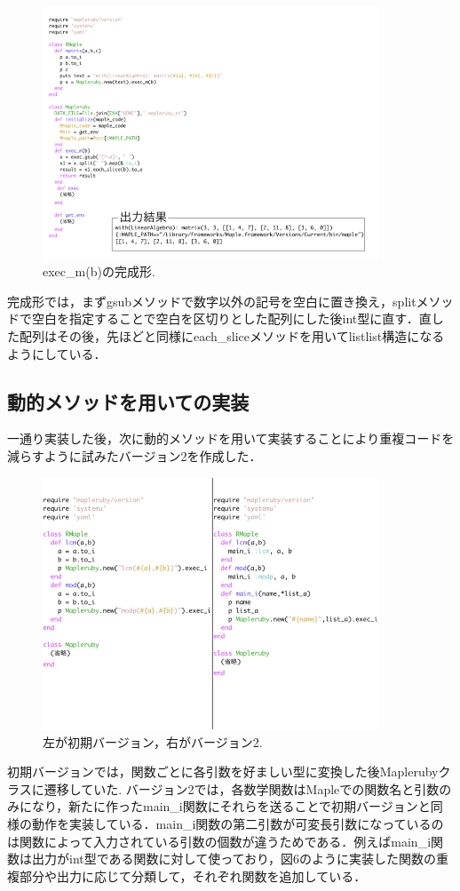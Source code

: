 \begin{figure}[htbp]\begin{center}
\includegraphics[width=10cm,bb= 0 0 737 553]{../figs/./mapleruby_eringi.005.png}
\caption{exec\_m(b)の完成形.}
\label{default}\end{center}\end{figure}
完成形では，まずgsubメソッドで数字以外の記号を空白に置き換え，splitメソッドで空白を指定することで空白を区切りとした配列にした後int型に直す．直した配列はその後，先ほどと同様にeach\_sliceメソッドを用いてlistlist構造になるようにしている．

\subsection{動的メソッドを用いての実装}
一通り実装した後，次に動的メソッドを用いて実装することにより重複コードを減らすように試みたバージョン2を作成した．

\begin{figure}[htbp]\begin{center}
\includegraphics[width=10cm,bb= 0 0 737 553]{../figs/./mapleruby_eringi.006.png}
\caption{左が初期バージョン，右がバージョン2.}
\label{default}\end{center}\end{figure}
初期バージョンでは，関数ごとに各引数を好ましい型に変換した後Maplerubyクラスに遷移していた.
バージョン2では，各数学関数はMapleでの関数名と引数のみになり，新たに作ったmain\_i関数にそれらを送ることで初期バージョンと同様の動作を実装している．main\_i関数の第二引数が可変長引数になっているのは関数によって入力されている引数の個数が違うためである．例えばmain\_i関数は出力がint型である関数に対して使っており，図6のように実装した関数の重複部分や出力に応じて分類して，それぞれ関数を追加している．


